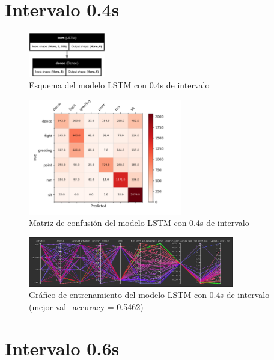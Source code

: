 \section{Intervalo 0.4s}

\begin{figure}[H]
    \centering
    \includegraphics[width=0.3\textwidth]{Imagenes/Bitmap/best-lstm0.4.png}
    \caption{Esquema del modelo LSTM con 0.4s de intervalo}
    \label{fig:lstm-0.4-final}
\end{figure}
\begin{figure}[H]
    \centering
    \includegraphics[width=0.6\textwidth]{Imagenes/Bitmap/CM_best-lstm0.4.png}
    \caption{Matriz de confusión del modelo LSTM con 0.4s de intervalo}
    \label{fig:lstm-0.4-matriz}
\end{figure}

\begin{figure}[H]
    \centering
    \includegraphics[width=0.8\textwidth]{Imagenes/Bitmap/tb-lstm-0.4.png}
    \caption{Gráfico de entrenamiento del modelo LSTM con 0.4s de intervalo (mejor val\_accuracy = 0.5462)}
    \label{fig:lstm-0.4-grafico}
\end{figure}

\section{Intervalo 0.6s}

